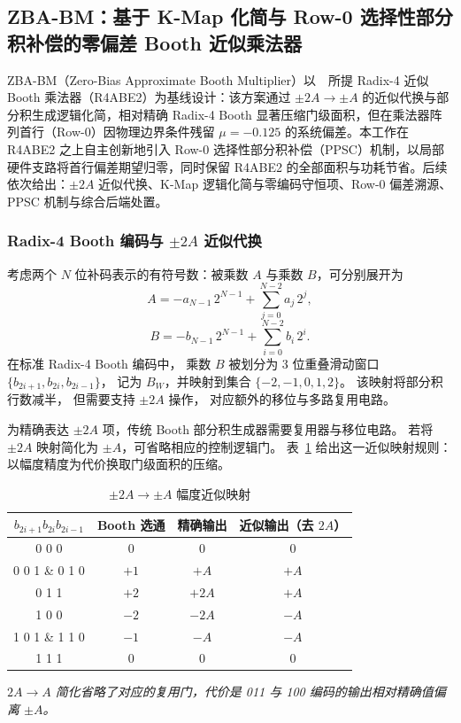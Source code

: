 \documentclass[12pt,a4paper,UTF8]{article}
\begin{document}
\subsection{ZBA-BM：基于 K-Map 化简与 Row-0 选择性部分积补偿的零偏差 Booth 近似乘法器}
\label{subsec:zbabm-arch}

ZBA-BM（Zero-Bias Approximate Booth Multiplier）以~\cite{liu2017radix4}~所提 Radix-4 近似 Booth 乘法器（R4ABE2）为基线设计：该方案通过 $\pm 2A \to \pm A$ 的近似代换与部分积生成逻辑化简，相对精确 Radix-4 Booth 显著压缩门级面积，但在乘法器阵列首行（Row-0）因物理边界条件残留 $\mu = -0.125$ 的系统偏差。本工作在 R4ABE2 之上自主创新地引入 Row-0 选择性部分积补偿（PPSC）机制，以局部硬件支路将首行偏差期望归零，同时保留 R4ABE2 的全部面积与功耗节省。后续依次给出：$\pm 2A$ 近似代换、K-Map 逻辑化简与零编码守恒项、Row-0 偏差溯源、PPSC 机制与综合后端处置。

\subsubsection{Radix-4 Booth 编码与 $\pm 2A$ 近似代换}

考虑两个 $N$ 位补码表示的有符号数：被乘数 $A$ 与乘数 $B$，可分别展开为
\begin{equation}
\label{eq:zbabm_a_expand}
A = -a_{N-1}\,2^{N-1} + \sum_{j=0}^{N-2} a_j\,2^j ,
\end{equation}
\begin{equation}
\label{eq:zbabm_b_expand}
B = -b_{N-1}\,2^{N-1} + \sum_{i=0}^{N-2} b_i\,2^i .
\end{equation}
在标准 Radix-4 Booth 编码中，
乘数 $B$ 被划分为 3 位重叠滑动窗口
\(\{b_{2i+1}, b_{2i}, b_{2i-1}\}\)，
记为 $B_W$，并映射到集合 $\{-2,-1,0,1,2\}$。
该映射将部分积行数减半，
但需要支持 $\pm 2A$ 操作，
对应额外的移位与多路复用电路。

为精确表达 $\pm 2A$ 项，传统 Booth 部分积生成器需要复用器与移位电路。
若将 $\pm 2A$ 映射简化为 $\pm A$，可省略相应的控制逻辑门。
表~\ref{tab:zbabm_approx_map} 给出这一近似映射规则：
以幅度精度为代价换取门级面积的压缩。

\begin{table}[htbp]
\centering
\caption{$\pm 2A \to \pm A$ 幅度近似映射}
\label{tab:zbabm_approx_map}
\small
\begin{tabular}{c|c|c|c}
\toprule
$b_{2i+1} b_{2i} b_{2i-1}$ & Booth 选通 & 精确输出 & 近似输出（去 $2A$） \\
\midrule
0 0 0           & $0$  & $0$    & $0$    \\
0 0 1 \& 0 1 0  & $+1$ & $+A$   & $+A$   \\
0 1 1           & $+2$ & $+2A$  & $+A$ \\
1 0 0           & $-2$ & $-2A$  & $-A$ \\
1 0 1 \& 1 1 0  & $-1$ & $-A$   & $-A$   \\
1 1 1           & $0$  & $0$    & $0$    \\
\bottomrule
\end{tabular}

\smallskip
\footnotesize{\textit{$2A \to A$ 简化省略了对应的复用门，代价是 011 与 100 编码的输出相对精确值偏离 $\pm A$。}}
\end{table}
\end{document}
